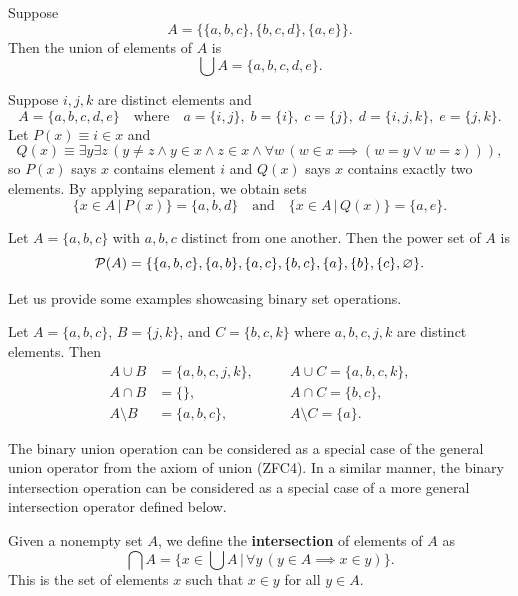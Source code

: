\begin{example}[Union]
	Suppose
	\[ A = \{\{a, b, c\}, \{b, c, d\}, \{a, e\}\}. \]
	Then the union of elements of $A$ is
	\[ \bigcup A = \{a, b, c, d, e\}. \]
\end{example}

\begin{example}[Separation]
	Suppose $i, j, k$ are distinct elements and
	\[ A = \{a, b, c, d, e\} \quad\text{where}\quad a = \{i, j\}, \; b = \{i\}, \; c = \{j\}, \; d = \{i, j, k\}, \; e = \{j, k\}. \]
	Let $P(x)\equiv i\in x$ and 
	\[ Q(x) \equiv \exists y\exists z\, (y\ne z\land y\in x\land z\in x\land\forall w\, (w \in x \implies (w = y\lor w = z))), \]
	so $P(x)$ says $x$ contains element $i$ and $Q(x)$ says $x$ contains exactly two elements. 
	By applying separation, we obtain sets
	\[ \{x\in A \,|\, P(x) \} = \{a, b, d\} \quad\text{and}\quad \{x\in A \,|\, Q(x)\} = \{a, e\}. \]
\end{example}

\begin{example}
	Let $A = \{a, b, c\}$ with $a, b, c$ distinct from one another.
	Then the power set of $A$ is
	\[ \mathcal{P}(A) = \{ \{a, b, c\}, \{a, b\}, \{a, c\}, \{b, c\}, \{a\}, \{b\}, \{c\}, \varnothing \}. \]
\end{example}

Let us provide some examples showcasing binary set operations.

\begin{example}
	Let $A = \{a, b, c\}$, $B = \{j, k\}$, and $C = \{b, c, k\}$ where $a, b, c, j, k$ are distinct elements.
	Then
	\begin{align*}
		A\cup B &= \{a, b, c, j, k\}, \quad &&A\cup C = \{a, b, c, k\}, \\
		A\cap B &= \{\}, \quad &&A\cap C = \{b, c\}, \\
		A\setminus B &= \{a, b, c\}, \quad &&A\setminus C = \{a\}.
	\end{align*}
\end{example}

The binary union operation can be considered as a special case of the general union operator from the axiom of union (ZFC4).
In a similar manner, the binary intersection operation can be considered as a special case of a more general intersection operator defined below. 

\begin{definition}[Intersections]
	Given a nonempty set $A$, we define the \textbf{intersection} of elements of $A$ as
	\[ \bigcap A = \{x\in\bigcup A \,|\, \forall y\, (y\in A\implies x\in y)\}. \]
	This is the set of elements $x$ such that $x\in y$ for all $y\in A$. 
\end{definition}

